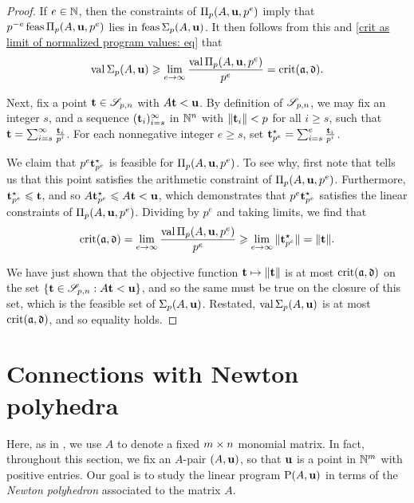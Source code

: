 \documentclass{amsart}
\begin{document}
\begin{proof}
   If $e \in \mathbb{N}$, then the constraints of $\Pi_p(A, \mathbf{u}, p^e)$ imply that $p^{-e}  \operatorname{feas} \Pi_p(A, \mathbf{u}, p^e)$ lies in $\operatorname{feas} \Sigma_p(A,\mathbf{u})$.
   It then follows from this and \eqref{crit as limit of normalized program values: eq} that
   \[
      \operatorname{val}\Sigma_p(A,\mathbf{u}) \geqslant \displaystyle \lim_{e \to \infty}\frac{\operatorname{val}\Pi_p(A,\mathbf{u}, p^e)}{p^e} = \operatorname{crit}(\mathfrak{a}, \mathfrak{d}).
   \]

   Next, fix a point $\mathbf{t} \in \mathscr{S}_{p,n}$ with $A \mathbf{t} < \mathbf{u}$.
   By definition of $\mathscr{S}_{p,n}$, we may fix an integer $s$, and a sequence $( \mathbf{t}_i )_{i=s}^\infty$ in $\mathbb{N}^n$ with $\| \mathbf{t}_i \| < p$ for all $i \geq s$, such that $\mathbf{t} = \sum_{i=s}^{\infty} \frac{\mathbf{t}_i}{p^i}$.
   For each nonnegative integer $e \geq s$, set $\mathbf{t}^\star_{p^e} = \sum_{i=s}^{e} \frac{\mathbf{t}_i}{p^i}$.

   We claim that $p^e  \mathbf{t}^\star_{p^e}$ is feasible for $\Pi_p(A, \mathbf{u}, p^e)$.
   To see why, first note that  tells us that this point satisfies the arithmetic constraint of $\Pi_p(A, \mathbf{u}, p^e)$.
   Furthermore, $\mathbf{t}^{\star}_{p^e} \leqslant \mathbf{t}$, and so $A \mathbf{t}^{\star}_{p^e} \leqslant A \mathbf{t} < \mathbf{u}$, which demonstrates that $p^e \mathbf{t}^\star_{p^e}$ satisfies the linear constraints of $\Pi_p(A, \mathbf{u}, p^e)$.
   Dividing by $p^e$ and taking limits, we find that
   \[
      \operatorname{crit}(\mathfrak{a}, \mathfrak{d}) = \lim_{e \to \infty} \frac{\operatorname{val} \Pi_p(A, \mathbf{u}, p^e)}{p^e} \geqslant \lim_{e \to \infty}   \| \mathbf{t}^\star_{p^e} \| = \| \mathbf{t} \|.
   \]

   We have just shown that the objective function $\mathbf{t} \mapsto \| \mathbf{t} \|$ is at most $\operatorname{crit}(\mathfrak{a}, \mathfrak{d})$ on the set $\{ \mathbf{t} \in \mathscr{S}_{p,n} : A \mathbf{t} < \mathbf{u} \}$, and so the same must be true on the closure of this set, which is the feasible set of $\Sigma_p(A, \mathbf{u})$.
   Restated,  $ \operatorname{val} \Sigma_p(A, \mathbf{u})$ is at most $\operatorname{crit}(\mathfrak{a},  \mathfrak{d})$, and so equality holds.
\end{proof}

\section{Connections with Newton polyhedra}
\label{s: newton}
Here, as in ,  we use $A$ to denote a fixed $m \times n$ monomial matrix.
In fact, throughout this section, we fix an $A$-pair $(A, \mathbf{u})$, so that $\mathbf{u}$ is a point in $\mathbb{N}^m$ with positive entries.
Our goal is to study the linear program $\mathrm{P}(A, \mathbf{u})$ in terms of the \emph{Newton polyhedron} associated to the matrix $A$.
\end{document}
